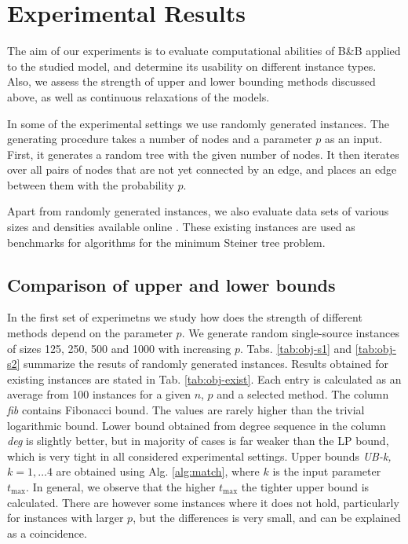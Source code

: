 \section{Experimental Results} \label{sec:exp}

The aim of our experiments is to evaluate computational abilities of B\&B applied to the studied model, and determine its usability on different instance types.
Also, we assess the strength of upper and lower bounding methods discussed above, as well as continuous relaxations of the models.

In some of the experimental settings we use randomly generated instances.
The generating procedure takes a number of nodes and a parameter $p$ as an input.
First, it generates a random tree with the given number of nodes.
It then iterates over all pairs of nodes that are not yet connected by an edge, and places an edge between them with the probability $p$.

Apart from randomly generated instances, we also evaluate data sets of various sizes and densities available online \cite{steinlib}.
These existing instances are used as benchmarks for algorithms for the minimum Steiner tree problem.

\subsection{Comparison of upper and lower bounds}

In the first set of experimetns we study how does the strength of different methods depend on the parameter $p$.
We generate random single-source instances of sizes 125, 250, 500 and 1000 with increasing $p$.
Tabs. \ref{tab:obj-s1} and \ref{tab:obj-s2} summarize the resuts of randomly generated instances.
Results obtained for existing instances are stated in Tab. \ref{tab:obj-exist}.
Each entry is calculated as an average from 100 instances for a given $n$, $p$ and a selected method.
The column \emph{fib} contains Fibonacci bound.
The values are rarely higher than the trivial logarithmic bound.
Lower bound obtained from degree sequence in the column \emph{deg} is slightly better, 
but in majority of cases is far weaker than the LP bound, which is very tight in all considered experimental settings.
Upper bounds \emph{UB-k, $k=1,\dots 4$} are obtained using Alg. \ref{alg:match}, where $k$ is the input parameter $t_{\text{max}}$.
In general, we observe that the higher $t_{\text{max}}$ the tighter upper bound is calculated.
There are however some instances where it does not hold, particularly for instances with larger $p$,  but the differences is very small, and can be explained as a coincidence.

